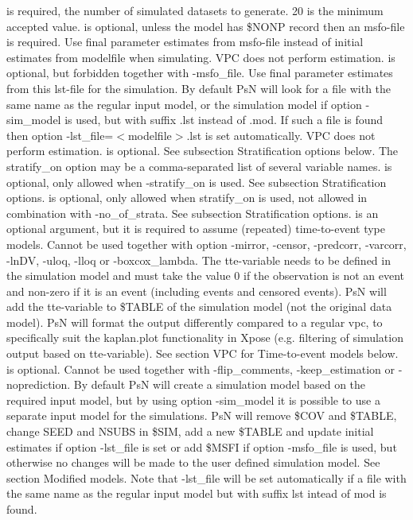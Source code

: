 \begin{optionlist}
is required, the number of simulated datasets to generate. 20 is the minimum accepted value. 
\nextopt
{}
is optional, unless the model has \$NONP record then an msfo-file 	is required. Use final parameter estimates from msfo-file instead of initial estimates from modelfile when simulating. VPC does not perform estimation. 
\nextopt
{}
is optional, but forbidden together with -msfo\_file. Use final parameter estimates from this lst-file for the simulation. By default PsN will look for a file with the same name as the regular input model, or the simulation model if option -sim\_model is used, but with suffix .lst instead of .mod. If such a file is found then option -lst\_file=$<$modelfile$>$.lst is set automatically. VPC does not perform estimation. 
\nextopt
{}
is optional. See subsection Stratification options below. The stratify\_on option may be a comma-separated list of several variable names. 
\nextopt
{}
is optional, only allowed when -stratify\_on is used. See subsection Stratification options.  
\nextopt
{}
is optional, only allowed when stratify\_on is used, not allowed in combination with -no\_of\_strata. See subsection Stratification options.  
\nextopt
{}
is an optional argument, but it is required to assume (repeated) time-to-event type models. Cannot be used together with option -mirror, -censor, -predcorr, -varcorr,  -lnDV, -uloq, -lloq or -boxcox\_lambda. The tte-variable needs to be defined in the simulation model and must take the value 0 if the observation is not an event and non-zero if it is an event (including events and censored events). PsN will add the tte-variable to \$TABLE of the simulation model (not the original data model). PsN will format the output differently compared to a regular vpc, to specifically suit the kaplan.plot functionality in Xpose (e.g. filtering of simulation output based on tte-variable). See section VPC for Time-to-event models below.   
\nextopt
{}
is optional. Cannot be used together with -flip\_comments, -keep\_estimation or -noprediction. By default PsN will create a simulation model based on the  required input model, but by using option -sim\_model it is possible to use a separate input model for the simulations. PsN will remove \$COV and \$TABLE, change SEED and NSUBS in \$SIM, add a new \$TABLE and  update initial estimates if option -lst\_file is set or add \$MSFI if option -msfo\_file is used, but otherwise no changes will be made to the user defined simulation model. See section Modified models. Note that -lst\_file will be set automatically if a file with the same name as the regular input model but with suffix lst intead of mod is found. 

\end{optionlist}
